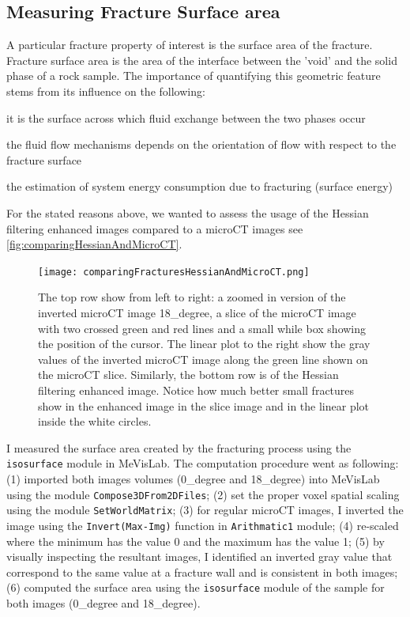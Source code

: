 \documentclass{edger}
\begin{document}
 
\subsection{Measuring Fracture Surface area} \label{sec:MeasuringFractureSurfaceArea}
A particular fracture property of interest is the surface area of the fracture.  Fracture surface area is the area of the interface between the 'void' and the solid phase of a rock sample. The importance of quantifying this geometric feature stems from its influence on the following:
\begin{tight_itemize}
	\item it is the surface across which fluid exchange between the two phases occur
	\item the fluid flow mechanisms depends on the orientation of flow with respect to the fracture surface
	\item the estimation of system energy consumption due to fracturing (surface energy) 
\end{tight_itemize}

For the stated reasons above, we wanted to assess the usage of the Hessian filtering enhanced images compared to a microCT images see \autoref{fig:comparingHessianAndMicroCT}. 

\begin{figure}[!h]
\centering
\texttt{[image: comparingFracturesHessianAndMicroCT.png]}
\caption{The top row show from left to right: a zoomed in version of the inverted microCT image 18\_degree, a slice of the microCT image with two crossed green and red lines and a small while box showing the position of the cursor. The linear plot to the right show the gray values of the inverted microCT image along the green line shown on the microCT slice.  Similarly, the bottom row is of the Hessian filtering enhanced image. Notice how much better small fractures show in the enhanced image in the slice image and in the linear plot inside the white circles. }
\label{fig:comparingHessianAndMicroCT}
\end{figure}

I measured the surface area created by the fracturing process using the \texttt{isosurface} module in MeVisLab. The computation procedure went as following: (1) imported both images volumes (0\_degree and 18\_degree) into MeVisLab using the module \texttt{Compose3DFrom2DFiles}; (2) set the proper voxel spatial scaling using the module \texttt{SetWorldMatrix}; (3) for regular microCT images, I inverted the image using the \texttt{Invert(Max-Img)} function in \texttt{Arithmatic1} module; (4) re-scaled where the minimum has the value 0 and the maximum has the value 1; (5) by visually inspecting the resultant images, I identified an inverted gray value that correspond to the same value at a fracture wall and is consistent in both images; (6) computed the surface area using the \texttt{isosurface} module of the sample for both images (0\_degree and 18\_degree).
\end{document}
